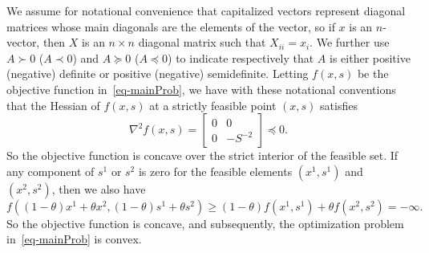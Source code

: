 \documentclass{article}
\def\pd{\succ}
\def\psd{\succeq}
\def\nd{\prec}
\def\nsd{\preceq}
\begin{document}
We assume for notational convenience that capitalized vectors
represent diagonal matrices whose main diagonals are the elements of 
the vector, so if $x$ is an $n$-vector, then $X$ is an $n \times n$ diagonal
matrix such that $X_{ii} = x_i$. We further use $A \pd 0$ ($A \nd 0$)
and $A \psd 0$ ($A \nsd 0$) to indicate respectively that $A$ is either 
positive (negative) definite or positive (negative) semidefinite. 
Letting $f(x,s)$ be the objective function in~\eqref{eq-mainProb}, 
we have with these notational conventions that the Hessian of $f(x,s)$
at a strictly feasible point $(x,s)$ satisfies
\[
\nabla^2 f(x,s) = 
    \left[ \begin{array}{cc} 0 & 0 \\[4pt] 0 & -S^{-2} \end{array} \right]
    \nsd 0.
\]
So the objective function is concave over the strict interior of the
feasible set. If any component of $s^1$ or $s^2$ is zero for the feasible
elements $(x^1, s^1)$ and $(x^2, s^2)$, then we also have
\[
f\left(  (1 - \theta)x^1 + \theta x^2, 
    (1 - \theta) s^1 + \theta s^2 \right) \ge 
        (1 - \theta) f(x^1,s^1) + \theta f(x^2, s^2) = -\infty.
\]
So the objective function is 
concave, and subsequently, the optimization problem in~\eqref{eq-mainProb} 
is convex.
\end{document}
